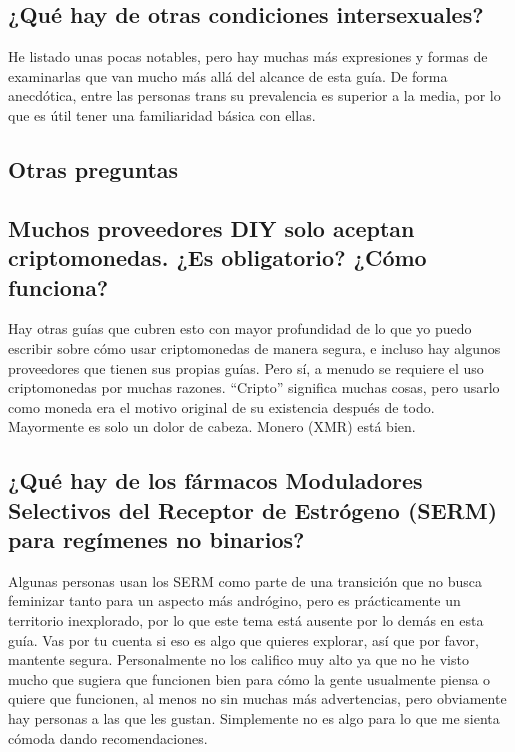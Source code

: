 \documentclass{article}
\begin{document}
\subsection{¿Qué hay de otras condiciones intersexuales?}

He listado unas pocas notables, pero hay muchas más expresiones y formas de examinarlas que van mucho más allá del alcance de esta guía. De forma anecdótica, entre las personas trans su prevalencia es superior a la media, por lo que es útil tener una familiaridad básica con ellas.

\subsection*{Otras preguntas}

\subsection{Muchos proveedores DIY solo aceptan criptomonedas. ¿Es obligatorio? ¿Cómo funciona?}

Hay otras guías que cubren esto con mayor profundidad de lo que yo puedo escribir sobre cómo usar criptomonedas de manera segura, e incluso hay algunos proveedores que tienen sus propias guías. Pero sí, a menudo se requiere el uso criptomonedas por muchas razones. “Cripto” significa muchas cosas, pero usarlo como moneda era el motivo original de su existencia después de todo. Mayormente es solo un dolor de cabeza. Monero (XMR) está bien.

\subsection{¿Qué hay de los fármacos Moduladores Selectivos del Receptor de Estrógeno (SERM) para regímenes no binarios?}

Algunas personas usan los SERM como parte de una transición que no busca feminizar tanto para un aspecto más andrógino, pero es prácticamente un territorio inexplorado, por lo que este tema está ausente por lo demás en esta guía. Vas por tu cuenta si eso es algo que quieres explorar, así que por favor, mantente segura. Personalmente no los califico muy alto ya que no he visto mucho que sugiera que funcionen bien para cómo la gente usualmente piensa o quiere que funcionen, al menos no sin muchas más advertencias, pero obviamente hay personas a las que les gustan. Simplemente no es algo para lo que me sienta cómoda dando recomendaciones.
\end{document}
